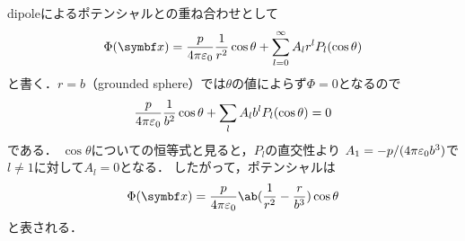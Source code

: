   dipoleによるポテンシャルとの重ね合わせとして
  \begin{gather}%
    \Phi(\bs{x}) = \frac{p}{4\pi\eps_0} \frac{1}{r^2}\cos\theta + \sum_{l=0}^\infty A_l r^l P_l(\cos\theta)
  \end{gather}%
  と書く．$r = b$（grounded sphere）では$\theta$の値によらず$\Phi = 0$となるので
  \begin{gather}%
    \frac{p}{4\pi\eps_0} \frac{1}{b^2} \cos\theta + \sum_l A_l b^l P_l(\cos\theta) = 0
  \end{gather}%
  である．
  $\cos\theta$についての恒等式と見ると，$P_l$の直交性より
  $A_1 =-p/(4\pi\varepsilon_0 b^3)$で$l \neq 1$に対して$ A_l = 0 $となる．
  したがって，ポテンシャルは
  \begin{gather}%
    \Phi(\bs{x}) = \frac{p}{4\pi \eps_0} \ab(\frac{1}{r^2} - \frac{r}{b^3}) \cos\theta
  \end{gather}%
  と表される．

\clearpage
